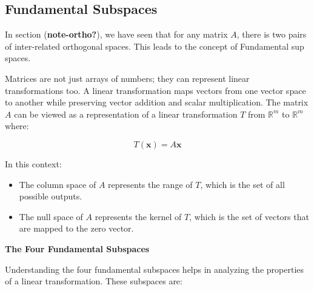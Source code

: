 \documentclass[
  letterpaper,
  DIV=11,
  numbers=noendperiod]{scrreprt}
\providecommand{\tightlist}{%
  \setlength{\itemsep}{0pt}\setlength{\parskip}{0pt}}\usepackage{longtable,booktabs,array}
\theoremstyle{plain}
\theoremstyle{definition}
\theoremstyle{remark}
\begin{document}
\subsection{Fundamental Subspaces}\label{fundamental-subspaces}

In section (\textbf{note-ortho?}), we have seen that for any matrix
\(A\), there is two pairs of inter-related orthogonal spaces. This leads
to the concept of Fundamental sup spaces.

Matrices are not just arrays of numbers; they can represent linear
transformations too. A linear transformation maps vectors from one
vector space to another while preserving vector addition and scalar
multiplication. The matrix \(A\) can be viewed as a representation of a
linear transformation \(T\) from \(\mathbb{R}^m\) to \(\mathbb{R}^m\)
where:

\[T(\mathbf{x}) = A \mathbf{x}\]

In this context:

\begin{itemize}
\tightlist
\item
  The column space of \(A\) represents the range of \(T\), which is the
  set of all possible outputs.
\item
  The null space of \(A\) represents the kernel of \(T\), which is the
  set of vectors that are mapped to the zero vector.
\end{itemize}

\textbf{The Four Fundamental Subspaces}

Understanding the four fundamental subspaces helps in analyzing the
properties of a linear transformation. These subspaces are:
\end{document}
